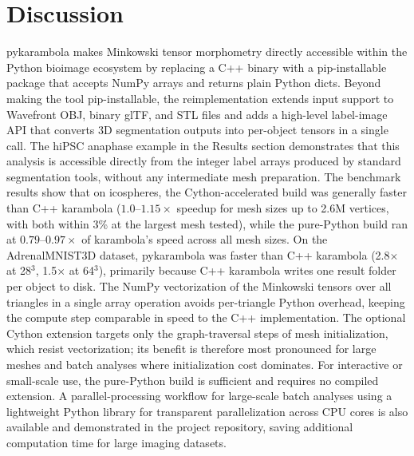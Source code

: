 \documentclass[times, twoside, watermark]{zHenriquesLab-StyleBioRxiv}
\begin{document}
\section*{Discussion}
pykarambola makes Minkowski tensor morphometry directly accessible within the Python bioimage ecosystem by replacing a C++ binary with a pip-installable package that accepts NumPy arrays and returns plain Python dicts.
Beyond making the tool pip-installable, the reimplementation extends input support to Wavefront OBJ, binary glTF, and STL files and adds a high-level label-image API that converts 3D segmentation outputs into per-object tensors in a single call.
The hiPSC anaphase example in the Results section demonstrates that this analysis is accessible directly from the integer label arrays produced by standard segmentation tools, without any intermediate mesh preparation.
The benchmark results show that on icospheres, the Cython-accelerated build was generally faster than C++ karambola ($1.0$--$1.15\times$ speedup for mesh sizes up to 2.6M vertices, with both within 3\% at the largest mesh tested), while the pure-Python build ran at $0.79$--$0.97\times$ of karambola's speed across all mesh sizes.
On the AdrenalMNIST3D dataset, pykarambola was faster than C++ karambola (2.8$\times$ at 28$^3$, 1.5$\times$ at 64$^3$), primarily because C++ karambola writes one result folder per object to disk.
The NumPy vectorization of the Minkowski tensors over all triangles in a single array operation avoids per-triangle Python overhead, keeping the compute step comparable in speed to the C++ implementation.
The optional Cython extension targets only the graph-traversal steps of mesh initialization, which resist vectorization; its benefit is therefore most pronounced for large meshes and batch analyses where initialization cost dominates.
For interactive or small-scale use, the pure-Python build is sufficient and requires no compiled extension.
A parallel-processing workflow for large-scale batch analyses using a lightweight Python library for transparent parallelization across CPU cores is also available and demonstrated in the project repository, saving additional computation time for large imaging datasets.
\end{document}
